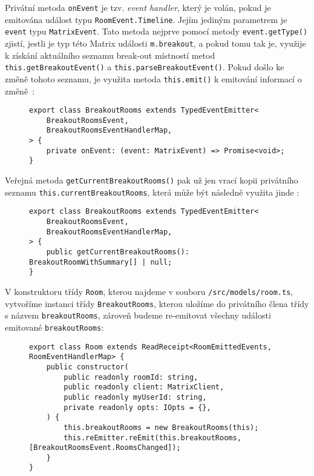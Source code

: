 Privátní metoda \texttt{onEvent} je tzv. \textit{event handler},
který je volán, pokud je emitována událost typu
\texttt{RoomEvent.Timeline}. Jejím jediným parametrem je
\texttt{event} typu \texttt{MatrixEvent}. Tato
metoda nejprve pomocí metody \texttt{event.getType()} zjistí,
jestli je typ této Matrix události \texttt{m.breakout}, a pokud tomu
tak je, využije k získání aktuálního seznamu break-out místností metod
\texttt{this.getBreakoutEvent()} a
\texttt{this.parseBreakoutEvent()}. Pokud došlo ke změně tohoto
seznamu, je využita metoda \texttt{this.emit()} k emitování
informací o změně~\parencite{GitHub-MatrixJSSDK-BreakoutRooms}:

\begin{figure}[H]
    \begin{verbatim}
export class BreakoutRooms extends TypedEventEmitter<
	BreakoutRoomsEvent,
	BreakoutRoomsEventHandlerMap,
> {
	private onEvent: (event: MatrixEvent) => Promise<void>;
}
	\end{verbatim}
\end{figure}

Veřejná metoda \texttt{getCurrentBreakoutRooms()} pak už jen
vrací kopii privátního seznamu
\texttt{this.currentBreakoutRooms}, která může být následně
využita jinde \parencite{GitHub-MatrixJSSDK-BreakoutRooms}:

\begin{figure}[H]
    \begin{verbatim}
export class BreakoutRooms extends TypedEventEmitter<
	BreakoutRoomsEvent,
	BreakoutRoomsEventHandlerMap,
> {
	public getCurrentBreakoutRooms(): BreakoutRoomWithSummary[] | null;
}
	\end{verbatim}
\end{figure}

V konstruktoru třídy \texttt{Room}, kterou najdeme v souboru
\texttt{/src/models/room.ts}, vytvoříme instanci třídy
\texttt{BreakoutRooms}, kterou uložíme do privátního člena třídy
s názvem \texttt{breakoutRooms}, zároveň budeme re-emitovat
všechny události emitované \texttt{breakoutRooms}:

\begin{figure}[H]
    \begin{verbatim}
export class Room extends ReadReceipt<RoomEmittedEvents, RoomEventHandlerMap> {
	public constructor(
		public readonly roomId: string,
		public readonly client: MatrixClient,
		public readonly myUserId: string,
		private readonly opts: IOpts = {},
	) {
		this.breakoutRooms = new BreakoutRooms(this);
		this.reEmitter.reEmit(this.breakoutRooms, [BreakoutRoomsEvent.RoomsChanged]);
	}
}
	\end{verbatim}
\end{figure}

